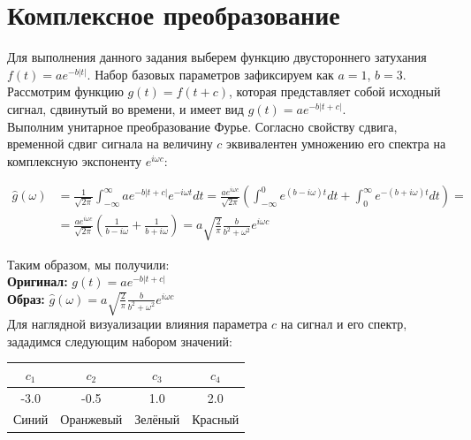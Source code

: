 \documentclass[a4paper,14pt]{extarticle}
\begin{document}
\newpage

\section{Комплексное преобразование}

Для выполнения данного задания выберем функцию двустороннего затухания $f(t) = ae^{-b|t|}$. Набор базовых параметров зафиксируем как $a=1$, $b=3$.\\

Рассмотрим функцию $g(t) = f(t + c)$, которая представляет собой исходный сигнал, сдвинутый во времени, и имеет вид $g(t) = ae^{-b|t+c|}$.\\

Выполним унитарное преобразование Фурье. Согласно свойству сдвига, временной сдвиг сигнала на величину 
$c$ эквивалентен умножению его спектра на комплексную экспоненту $e^{i\omega c}$:

\begin{equation*}
    \begin{split}
    \hat{g}(\omega) &= \frac{1}{\sqrt{2\pi}} \int_{-\infty}^{\infty} a e^{-b|t+c|} e^{-i\omega t} dt = \frac{a e^{i\omega c}}{\sqrt{2\pi}} \left( \int_{-\infty}^{0} e^{(b-i\omega)t} dt + \int_{0}^{\infty} e^{-(b+i\omega)t} dt \right) =\\
    & = \frac{a e^{i\omega c}}{\sqrt{2\pi}} \left( \frac{1}{b-i\omega} + \frac{1}{b+i\omega} \right) = a \sqrt{\frac{2}{\pi}} \frac{b}{b^2 + \omega^2} e^{i\omega c}
    \end{split}
\end{equation*}

Таким образом, мы получили:\\
\textbf{Оригинал:} $g(t) = ae^{-b|t+c|}$\\
\textbf{Образ:} $\hat{g}(\omega) = a \sqrt{\frac{2}{\pi}} \frac{b}{b^2 + \omega^2} e^{i\omega c}$\\

Для наглядной визуализации влияния параметра $c$ на сигнал и его спектр, 
зададимся следующим набором значений:
\begin{center}
    \begin{tabular}{|c|c|c|c|}
        \hline
        $c_1$ & $c_2$ & $c_3$ & $c_4$ \\
        \hline
         -3.0 & -0.5 & 1.0 & 2.0 \\
         \hline
         Синий & Оранжевый & Зелёный & Красный \\
         \hline
    \end{tabular}
\end{center}
\end{document}
